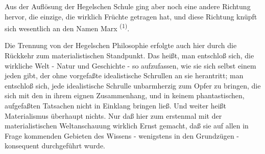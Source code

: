 Aus der Auflösung der Hegelschen Schule ging aber noch eine
andere Richtung hervor, die einzige, die wirklich Früchte getragen hat,
und diese Richtung knüpft sich wesentlich an den Namen
Marx \textsuperscript{(1)}.

Die Trennung von der Hegelschen Philosophie erfolgte auch hier
durch die Rückkehr zum materialistischen Standpunkt. Das heißt, man
entschloß sich, die wirkliche Welt - Natur und Geschichte - so
aufzufassen, wie sie sich selbst einem jeden gibt, der ohne vorgefaßte
idealistische Schrullen an sie herantritt; man entschloß sich, jede
idealistische Schrulle unbarmherzig zum Opfer zu bringen, die sich mit
den in ihrem eignen Zusammenhang, und in keinem phantastischen,
aufgefaßten Tatsachen nicht in Einklang bringen ließ. Und weiter heißt
Materialismus überhaupt nichts. Nur daß hier zum erstenmal mit der
materialistischen Weltanschauung wirklich Ernst gemacht, daß sie auf
allen in Frage kommenden Gebieten des Wissens - wenigstens in den
Grundzügen - konsequent durchgeführt wurde.


